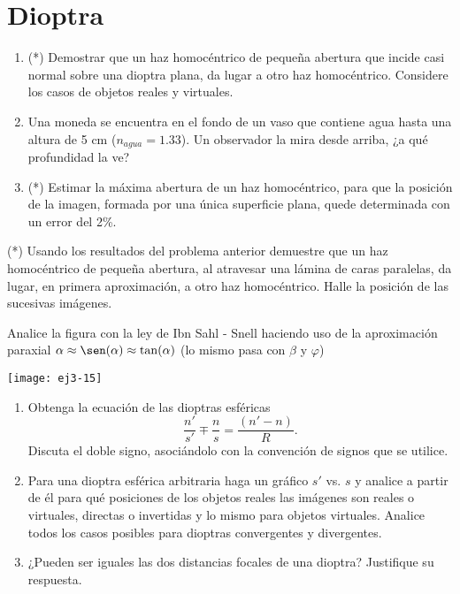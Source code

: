 \section*{Dioptra}

\item 
\begin{enumerate}
	\item (*) Demostrar que un haz homocéntrico de pequeña abertura que incide casi normal sobre una dioptra plana, da lugar a otro haz homocéntrico.
	Considere los casos de objetos reales y virtuales.
	\item Una moneda se encuentra en el fondo de un vaso que contiene agua hasta una altura de 5 cm ($n_{agua}=1.33$).
	Un observador la mira desde arriba, ¿a qué profundidad la ve?
	\item (*) Estimar la máxima abertura de un haz homocéntrico, para que la posición de la imagen, formada por una única superficie plana, quede determinada con un error del 2\%. 
\end{enumerate}


\item (*) Usando los resultados del problema anterior demuestre que un haz homocéntrico de pequeña abertura, al atravesar una lámina de caras paralelas, da lugar, en primera aproximación, a otro haz homocéntrico.
Halle la posición de las sucesivas imágenes. 


\item
\begin{minipage}[t][1.4cm]{0.55\textwidth}
	Analice la figura con la ley de Ibn Sahl - Snell haciendo uso de la aproximación paraxial $\alpha \approx \sen( \alpha ) \approx \tan( \alpha )$ (lo mismo pasa con $\beta$ y $\varphi$) 
\end{minipage}
\begin{minipage}[c][0.4cm][t]{0.4\textwidth}
	\texttt{[image: ej3-15]}
\end{minipage}
\begin{enumerate}
	\item
	Obtenga la ecuación de las dioptras esféricas
	\[
		\frac{n'}{s'}\mp\frac{n}{s}=\frac{(n'-n)}{R} .
	\]
	Discuta el doble signo, asociándolo con la convención de signos que se utilice.
	\item Para una dioptra esférica arbitraria haga un gráfico $s'$ vs. $s$ y analice a partir de él para qué posiciones de los objetos reales las imágenes son reales o virtuales, directas o invertidas y lo mismo para objetos virtuales.
	Analice todos los casos posibles para dioptras convergentes y divergentes.
	\item ¿Pueden ser iguales las dos distancias focales de una dioptra?
	Justifique su respuesta.
\end{enumerate}

